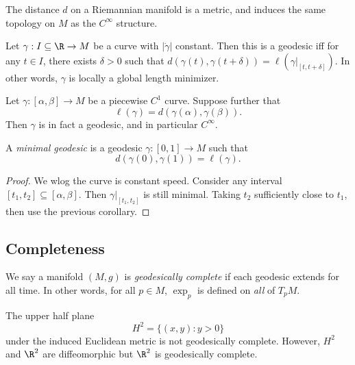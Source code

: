 \documentclass[a4paper]{article}
\begin{document}
\begin{cor}
  The distance $d$ on a Riemannian manifold is a metric, and induces the same topology on $M$ as the $C^\infty$ structure.
\end{cor}

\begin{cor}
  Let $\gamma: I \subseteq \R \to M$ be a curve with $|\dot{\gamma}|$ constant. Then this is a geodesic iff for any $t \in I$, there exists $\delta > 0$ such that $d(\gamma(t), \gamma(t + \delta)) = \ell(\gamma|_{ [t, t + \delta]})$. In other words, $\gamma$ is locally a global length minimizer.
\end{cor}

\begin{prop}
  Let $\gamma: [\alpha, \beta] \to M$ be a piecewise $C^1$ curve. Suppose further that
  \[
    \ell(\gamma) = d(\gamma(\alpha), \gamma(\beta)).
  \]
  Then $\gamma$ is in fact a geodesic, and in particular $C^\infty$.
\end{prop}

\begin{defi}
  A \emph{minimal geodesic} is a geodesic $\gamma: [0, 1] \to M$ such that
  \[
    d(\gamma(0), \gamma(1)) = \ell(\gamma).
  \]
\end{defi}

\begin{proof}
  We wlog the curve is constant speed. Consider any interval $[t_1, t_2] \subseteq [\alpha, \beta]$. Then $\gamma|_{[t_1, t_2]}$ is still minimal. Taking $t_2$ sufficiently close to $t_1$, then use the previous corollary.
\end{proof}

\subsection{Completeness}
\begin{defi}
  We say a manifold $(M, g)$ is \emph{geodesically complete} if each geodesic extends for all time. In other words, for all $p \in M$, $\exp_p$ is defined on \emph{all} of $T_p M$.
\end{defi}

\begin{eg}
  The upper half plane
  \[
    H^2 = \{(x, y) : y> 0\}
  \]
  under the induced Euclidean metric is not geodesically complete. However, $H^2$ and $\R^2$ are diffeomorphic but $\R^2$ is geodesically complete.
\end{eg}
\end{document}
